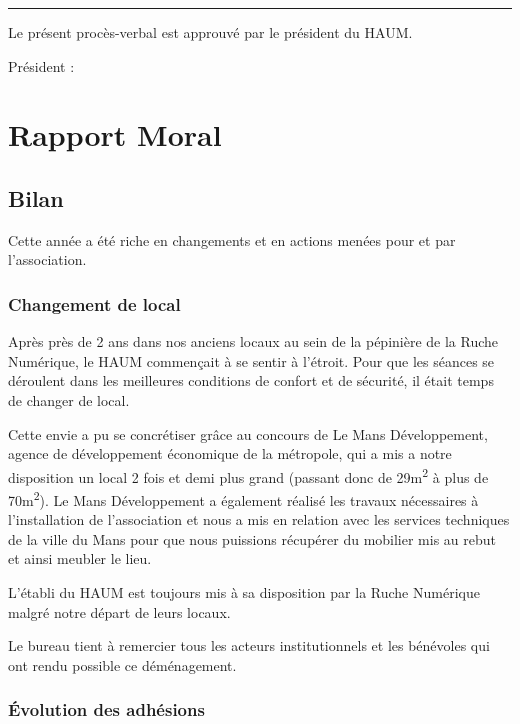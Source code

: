 \documentclass[a4paper, 11pt]{article}
\newcommand\sep{\noindent\rule{\linewidth}{.5pt}}
\begin{document}
\bigskip\bigskip

\sep

\bigskip\bigskip

Le présent procès-verbal est approuvé par le président du HAUM.

\bigskip\bigskip

Président :



\newpage

\section{Rapport Moral}

\subsection{Bilan}

Cette année a été riche en changements et en actions menées pour et par l'association.

\subsubsection{Changement de local}

Après près de 2 ans dans nos anciens locaux au sein de la pépinière de la Ruche Numérique, le HAUM commençait à se sentir à l'étroit. Pour que les séances se déroulent dans les meilleures conditions de confort et de sécurité, il était temps de changer de local.

Cette envie a pu se concrétiser grâce au concours de Le Mans Développement, agence de développement économique de la métropole, qui a mis a notre disposition un local 2 fois et demi plus grand (passant donc de 29m\textsuperscript{2} à plus de 70m\textsuperscript{2}). Le Mans Développement a également réalisé les travaux nécessaires à l'installation de l'association et nous a mis en relation avec les services techniques de la ville du Mans pour que nous puissions récupérer du mobilier mis au rebut et ainsi meubler le lieu.

L'établi du HAUM est toujours mis à sa disposition par la Ruche Numérique malgré notre départ de leurs locaux.

Le bureau tient à remercier tous les acteurs institutionnels et les bénévoles qui ont rendu possible ce déménagement.

\subsubsection{Évolution des adhésions}
\end{document}
